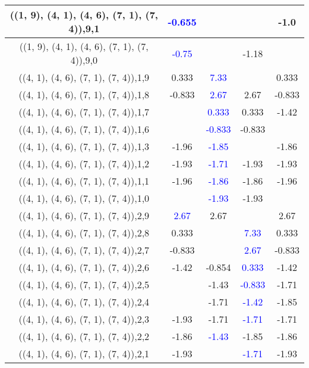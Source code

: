 \documentclass{article}
\begin{document}
\begin{center}
\begin{longtable}{|c|c|c|c|c|}
        	\hline
        	((1, 9), (4, 1), (4, 6), (7, 1), (7, 4)),9,1& \textcolor{blue}{-0.655}&&&-1.0\\
        	\hline
        	((1, 9), (4, 1), (4, 6), (7, 1), (7, 4)),9,0& \textcolor{blue}{-0.75}&&-1.18&\\
        	\hline
        	((4, 1), (4, 6), (7, 1), (7, 4)),1,9&0.333& \textcolor{blue}{7.33}&&0.333\\
        	\hline
        	((4, 1), (4, 6), (7, 1), (7, 4)),1,8&-0.833& \textcolor{blue}{2.67}&2.67&-0.833\\
        	\hline
        	((4, 1), (4, 6), (7, 1), (7, 4)),1,7&& \textcolor{blue}{0.333}&0.333&-1.42\\
        	\hline
        	((4, 1), (4, 6), (7, 1), (7, 4)),1,6&& \textcolor{blue}{-0.833}&-0.833&\\
        	\hline
        	((4, 1), (4, 6), (7, 1), (7, 4)),1,3&-1.96& \textcolor{blue}{-1.85}&&-1.86\\
        	\hline
        	((4, 1), (4, 6), (7, 1), (7, 4)),1,2&-1.93& \textcolor{blue}{-1.71}&-1.93&-1.93\\
        	\hline
        	((4, 1), (4, 6), (7, 1), (7, 4)),1,1&-1.96& \textcolor{blue}{-1.86}&-1.86&-1.96\\
        	\hline
        	((4, 1), (4, 6), (7, 1), (7, 4)),1,0&& \textcolor{blue}{-1.93}&-1.93&\\
        	\hline
        	((4, 1), (4, 6), (7, 1), (7, 4)),2,9& \textcolor{blue}{2.67}&2.67&&2.67\\
        	\hline
        	((4, 1), (4, 6), (7, 1), (7, 4)),2,8&0.333&& \textcolor{blue}{7.33}&0.333\\
        	\hline
        	((4, 1), (4, 6), (7, 1), (7, 4)),2,7&-0.833&& \textcolor{blue}{2.67}&-0.833\\
        	\hline
        	((4, 1), (4, 6), (7, 1), (7, 4)),2,6&-1.42&-0.854& \textcolor{blue}{0.333}&-1.42\\
        	\hline
        	((4, 1), (4, 6), (7, 1), (7, 4)),2,5&&-1.43& \textcolor{blue}{-0.833}&-1.71\\
        	\hline
        	((4, 1), (4, 6), (7, 1), (7, 4)),2,4&&-1.71& \textcolor{blue}{-1.42}&-1.85\\
        	\hline
        	((4, 1), (4, 6), (7, 1), (7, 4)),2,3&-1.93&-1.71& \textcolor{blue}{-1.71}&-1.71\\
        	\hline
        	((4, 1), (4, 6), (7, 1), (7, 4)),2,2&-1.86& \textcolor{blue}{-1.43}&-1.85&-1.86\\
        	\hline
        	((4, 1), (4, 6), (7, 1), (7, 4)),2,1&-1.93&& \textcolor{blue}{-1.71}&-1.93\\

\end{longtable}
\end{center}
\end{document}
